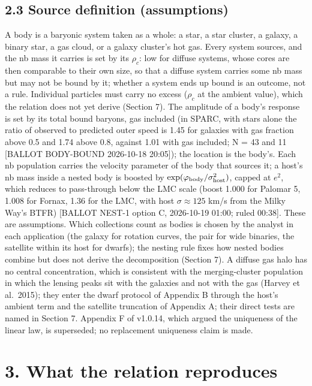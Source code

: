 \documentclass[
  10pt,
]{article}
\begin{document}
\subsection{2.3 Source definition (assumptions)}\label{source-definition-assumptions}

A body is a baryonic system taken as a whole: a star, a star cluster, a
galaxy, a binary star, a gas cloud, or a galaxy cluster's hot gas. Every system
sources, and the nb mass it carries is set by its $\rho_c$: low for
diffuse systems, whose cores are then comparable to their own size, so
that a diffuse system carries some nb mass but may not be bound by it;
whether a system ends up bound is an outcome, not a rule. Individual
particles must carry no excess ($\rho_c$ at the ambient value), which the
relation does not yet derive (Section 7). The
amplitude of a body's response is set by its total bound baryons, gas
included (in SPARC, with stars alone the ratio of observed to predicted
outer speed is 1.45 for galaxies with gas fraction above 0.5 and 1.74
above 0.8, against 1.01 with gas included; N = 43 and 11 {[}BALLOT
BODY-BOUND 2026-10-18 20:05{]}); the location is the body's. Each nb
population carries the velocity parameter of the body that sources it; a
host's nb mass inside a nested body is boosted by
$\exp(\varphi_{\rm body}/\sigma_{\rm host}^2)$, capped at $e^2$, which reduces to
pass-through below the LMC scale (boost 1.000 for Palomar 5, 1.008 for
Fornax, 1.36 for the LMC, with host $\sigma\approx125$ km/s from the Milky Way's BTFR) {[}BALLOT NEST-1 option C, 2026-10-19 01:00; ruled 00:38{]}. These are assumptions. Which collections count as bodies is chosen by the analyst in each application (the galaxy for rotation curves, the pair for wide binaries, the satellite within its host for dwarfs); the nesting rule fixes how nested bodies combine but does not derive the decomposition (Section 7). A diffuse gas halo has no central concentration, which is
consistent with the merging-cluster population in which the lensing peaks
sit with the galaxies and not with the gas (Harvey et al.~2015); they enter the dwarf protocol of Appendix B through the
host's ambient term and the satellite truncation of Appendix A; their
direct tests are named in Section 7. Appendix F of v1.0.14, which argued
the uniqueness of the linear law, is superseded; no replacement
uniqueness claim is made.

\section{3. What the relation reproduces}\label{what-the-law-reproduces}
\end{document}
